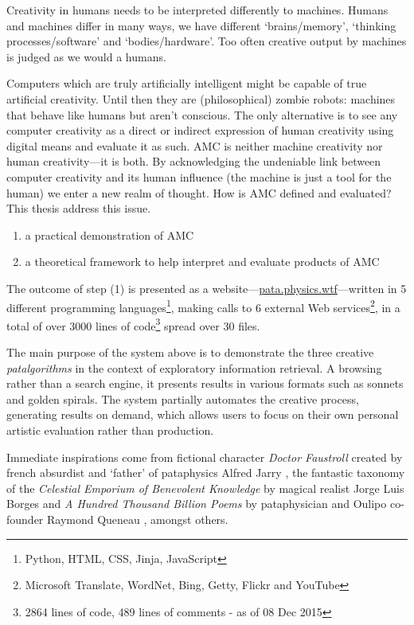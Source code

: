 Creativity in humans needs to be interpreted differently to machines. Humans and machines differ in many ways, we have different `brains/memory', `thinking processes/software' and `bodies/hardware'. Too often creative output by machines is judged as we would a humans. 

Computers which are truly artificially intelligent might be capable of true artificial creativity. Until then they are (philosophical) zombie robots: machines that behave like humans but aren't conscious. The only alternative is to see any computer creativity as a direct or indirect expression of human creativity using digital means and evaluate it as such. \ac{AMC} is neither machine creativity nor human creativity---it is both. By acknowledging the undeniable link between computer creativity and its human influence (the machine is just a tool for the human) we enter a new realm of thought. How is \ac{AMC} defined and evaluated? This thesis address this issue. 

\begin{enumerate}
  \item a practical demonstration of \ac{AMC}
  \item a theoretical framework to help interpret and evaluate products of \ac{AMC}
\end{enumerate}

The outcome of step (1) is presented as a website---\url{pata.physics.wtf}---written in \num{5} different programming languages\footnote{Python, \ac{HTML}, CSS, Jinja, JavaScript}, making calls to \num{6} external Web services\footnote{Microsoft Translate, WordNet, Bing, Getty, Flickr and YouTube}, in a total of over \num{3000} lines of code\footnote{\num{2864} lines of code, \num{489} lines of comments - as of 08 Dec 2015} spread over \num{30} files.

The main purpose of the system above is to demonstrate the three creative \emph{patalgorithms} in the context of exploratory information retrieval. A browsing rather than a search engine, it presents results in various formats such as sonnets and golden spirals. The system partially automates the creative process, generating results on demand, which allows users to focus on their own personal artistic evaluation rather than production.

Immediate inspirations come from fictional character \textit{Doctor Faustroll} created by french absurdist and `father' of pataphysics Alfred Jarry \autocite*{Jarry1996}, the fantastic taxonomy of the \textit{Celestial Emporium of Benevolent Knowledge} by magical realist Jorge Luis Borges \autocite*{Borges2000} and \textit{A Hundred Thousand Billion Poems} by pataphysician and Oulipo co-founder Raymond Queneau \autocite*{Queneau1961}, amongst others.

